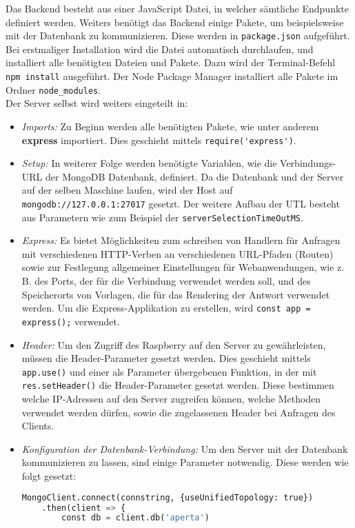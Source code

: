 Das Backend besteht aus einer JavaScript Datei, in welcher sämtliche Endpunkte definiert werden. Weiters benötigt das Backend einige Pakete, um beispielsweise mit der Datenbank zu kommunizieren. Diese werden in \verb|package.json| aufgeführt. Bei erstmaliger Installation wird die Datei automatisch durchlaufen, und installiert alle benötigten Dateien und Pakete. Dazu wird der Terminal-Befehl \verb|npm install| ausgeführt. Der Node Package Manager installiert alle Pakete im Ordner \verb|node_modules|.\\
Der Server selbst wird weiters eingeteilt in:

\begin{itemize}
    \item \textit{Imports: } Zu Beginn werden alle benötigten Pakete, wie unter anderem \textbf{express} importiert. Dies geschieht mittels \verb|require('express')|.
    \item \textit{Setup:  } In weiterer Folge werden benötigte Variablen, wie die Verbindungs-URL der MongoDB Datenbank, definiert. Da die Datenbank und der Server auf der selben Maschine laufen, wird der Host auf \verb|mongodb://127.0.0.1:27017| gesetzt. Der weitere Aufbau der UTL besteht aus Parametern wie zum Beispiel der \verb|serverSelectionTimeOutMS|.
    \item \textit{Express: }  Es bietet Möglichkeiten zum schreiben von Handlern für Anfragen mit verschiedenen HTTP-Verben an verschiedenen URL-Pfaden (Routen) sowie zur Festlegung allgemeiner Einstellungen für Webanwendungen, wie z. B. des Ports, der für die Verbindung verwendet werden soll, und des Speicherorts von Vorlagen, die für das Rendering der Antwort verwendet werden. Um die Express-Applikation zu erstellen, wird \verb|const app = express();| verwendet.
    \item \textit{Header: } Um den Zugriff des Raspberry auf den Server zu gewährleisten, müssen die Header-Parameter gesetzt werden. Dies geschieht mittels \verb|app.use()| und einer als Parameter übergebenen Funktion, in der mit \verb|res.setHeader()| die Header-Parameter gesetzt werden. Diese bestimmen welche IP-Adressen auf den Server zugreifen können, welche Methoden verwendet werden dürfen, sowie die zugelassenen Header bei Anfragen des Clients.
    \item \textit{Konfiguration der Datenbank-Verbindung: } Um den Server mit der Datenbank kommunizieren zu lassen, sind einige Parameter notwendig. Diese werden wie folgt gesetzt: \begin{lstlisting}[language=Python, caption=Konfiguration der Datenbankanbindung, label=lst:impl:dbconf]
    MongoClient.connect(connstring, {useUnifiedTopology: true})
    .then(client => {
        const db = client.db('aperta')


\end{lstlisting}
\end{itemize}
